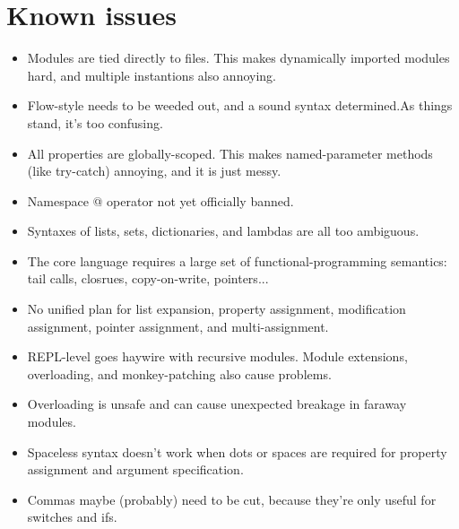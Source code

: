 \chapter{Known issues}

\begin{itemize}
\item Modules are tied directly to files. This makes dynamically imported modules hard, and multiple instantions also annoying.
\item Flow-style needs to be weeded out, and a sound syntax determined.As things stand, it's too confusing.
\item All properties are globally-scoped. This makes named-parameter methods (like try-catch) annoying, and it is just messy.
\item Namespace @ operator not yet officially banned.
\item Syntaxes of lists, sets, dictionaries, and lambdas are all too ambiguous.
\item The core language requires a large set of functional-programming semantics: tail calls, closrues, copy-on-write, pointers...
\item No unified plan for list expansion, property assignment, modification assignment, pointer assignment, and multi-assignment.
\item REPL-level goes haywire with recursive modules. Module extensions, overloading, and monkey-patching also cause problems.
\item Overloading is unsafe and can cause unexpected breakage in faraway modules.
\item Spaceless syntax doesn't work when dots or spaces are required for property assignment and argument specification.
\item Commas maybe (probably) need to be cut, because they're only useful for switches and ifs.
\end{itemize}
